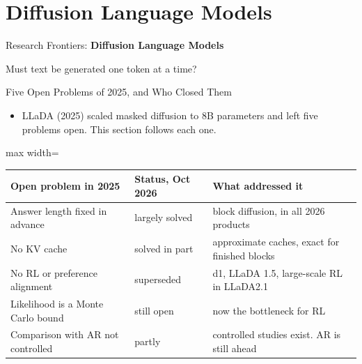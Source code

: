 \section{Diffusion Language Models}

\begin{frame}{}
    \LARGE Research Frontiers: \textbf{Diffusion Language Models}

    \vspace{1em}
    \normalsize Must text be generated one token at a time?
\end{frame}

\begin{frame}{Five Open Problems of 2025, and Who Closed Them}
    \begin{itemize}\itemsep0.3em
        \item LLaDA (2025) scaled masked diffusion to 8B parameters and left five problems open. This section follows each one.
    \end{itemize}
    \begin{center}
    \small
    \renewcommand{\arraystretch}{1.25}
    \setlength{\tabcolsep}{4pt}\begin{adjustbox}{max width=\linewidth}\begin{tabular}{lll}
        \toprule
        \textbf{Open problem in 2025} & \textbf{Status, Oct 2026} & \textbf{What addressed it} \\
        \midrule
        Answer length fixed in advance & largely solved & block diffusion, in all 2026 products \\
        No KV cache & solved in part & approximate caches, exact for finished blocks \\
        No RL or preference alignment & \alert{superseded} & d1, LLaDA 1.5, large-scale RL in LLaDA2.1 \\
        Likelihood is a Monte Carlo bound & still open & now the bottleneck for RL \\
        Comparison with AR not controlled & partly & controlled studies exist. AR is still ahead \\
        \bottomrule
    \end{tabular}\end{adjustbox}
    \end{center}
\end{frame}

